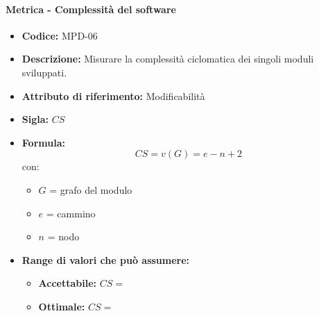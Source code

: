            \paragraph{Metrica - Complessità del software} 
              \begin{itemize}
         \item   \textbf{Codice:} MPD-06
         \item   \textbf{Descrizione:} Misurare la complessità ciclomatica dei singoli moduli sviluppati.
          \item  \textbf{Attributo di riferimento:} Modificabilità
          \item  \textbf{Sigla:} $CS$
         \item   \textbf{Formula:} $$CS = v(G) = e - n + 2 $$
         con:
         \begin{itemize}
            \item $G$ = grafo del modulo
            \item $e$ = cammino
            \item $n$ = nodo
         \end{itemize}
           
        \item \textbf{Range di valori che può assumere:}
        \begin{itemize}
            \item \textbf{Accettabile:} $CS = $
            \item \textbf{Ottimale:} $CS = $
        \end{itemize}
       \end{itemize}
              


